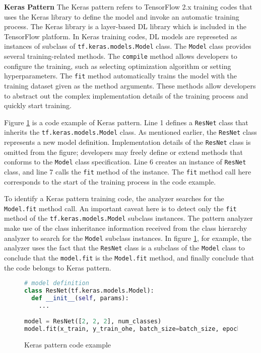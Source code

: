 \textbf{Keras Pattern}
The Keras pattern refers to TensorFlow 2.x training codes that uses
the Keras library to define the model and invoke an automatic
training process.
The Keras library\cite{keras} is a layer-based DL library which is
included in the TensorFlow platform.
In Keras training codes, DL models are represeted as instances of
subclass of {\tt tf.keras.models.Model} class.
The {\tt Model} class provides several training-related methods.
The {\tt compile} method allows developers to configure the training,
such as selecting optimization algorithm or setting hyperparameters.
The {\tt fit} method automatically trains the model with
the training dataset given as the method arguments.
These methods allow developers to abstract out the complex implementation
details of the training process and quickly start training.

Figure \ref{fig:keraspattern} is a code example of Keras pattern.
Line 1 defines a {\tt ResNet} class that inherits the 
{\tt tf.keras.models.Model} class. As mentioned earlier, the {\tt ResNet}
class represents a new model definition.
Implementation details of the {\tt ResNet} class is omitted from the 
figure; developers may freely define or extend methods that conforms to the
{\tt Model} class specification.
Line 6 creates an instance of {\tt ResNet} class, and line 7
calls the {\tt fit} method of the instance. 
The {\tt fit} method call here corresponds to the start of the training process
in the code example.

To identify a Keras pattern training code, the analyzer searches for the
{\tt Model.fit} method call. An important caveat here is to 
detect only the {\tt fit} method of the {\tt tf.keras.models.Model} 
subclass instances. The pattern analyzer make use of the class inheritance
information received from the class hierarchy analyzer to search for
the {\tt Model} subclass instances. In figure \ref{fig:keraspattern},
for example, the analyzer uses the fact that the {\tt ResNet} class is
a subclass of the {\tt Model} class to conclude that the {\tt model.fit}
is the {\tt Model.fit} method, and finally conclude that the code
belongs to Keras pattern.


\begin{figure}[ht!]
  \begin{lstlisting}[language=Python]
# model definition
class ResNet(tf.keras.models.Model):
  def __init__(self, params):
    ...

model = ResNet([2, 2, 2], num_classes)
model.fit(x_train, y_train_ohe, batch_size=batch_size, epochs=epochs,
  \end{lstlisting}
 
  \caption{Keras pattern code example}
  \label{fig:keraspattern}
\end{figure}
